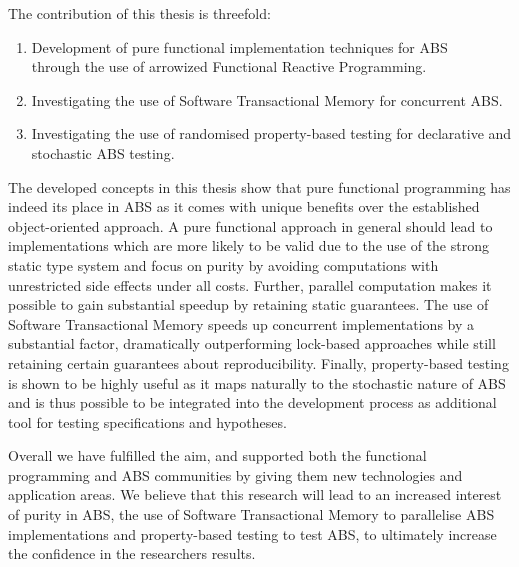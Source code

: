 The contribution of this thesis is threefold:
\begin{enumerate}
	\item Development of pure functional implementation techniques for ABS \\ through the use of arrowized Functional Reactive Programming.
	\item Investigating the use of Software Transactional Memory for concurrent ABS.
	\item Investigating the use of randomised property-based testing for declarative and stochastic ABS testing.
\end{enumerate}

The developed concepts in this thesis show that pure functional programming has indeed its place in ABS as it comes with unique benefits over the established object-oriented approach. A pure functional approach in general should lead to implementations which are more likely to be valid due to the use of the strong static type system and focus on purity by avoiding computations with unrestricted side effects under all costs. Further, parallel computation makes it possible to gain substantial speedup by retaining static guarantees. The use of Software Transactional Memory speeds up concurrent implementations by a substantial factor, dramatically outperforming lock-based approaches while still retaining certain guarantees about reproducibility. Finally, property-based testing is shown to be highly useful as it maps naturally to the stochastic nature of ABS and is thus possible to be integrated into the development process as additional tool for testing specifications and hypotheses.


Overall we have fulfilled the aim, and supported both the functional programming and ABS communities by giving them new technologies and application areas. We believe that this research will lead to an increased interest of purity in ABS, the use of Software Transactional Memory to parallelise ABS implementations and property-based testing to test ABS, to ultimately increase the confidence in the researchers results.